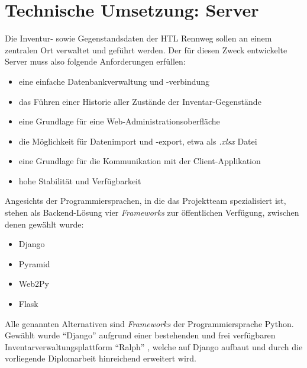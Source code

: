 \hypertarget{technische-umsetzung-server}{%
\section{Technische Umsetzung:
Server}\label{technische-umsetzung-server}}

Die Inventur- sowie Gegenstandsdaten der HTL Rennweg sollen an einem
zentralen Ort verwaltet und geführt werden. Der für diesen Zweck
entwickelte Server muss also folgende Anforderungen erfüllen:

\begin{itemize}
\tightlist
\item
  eine einfache Datenbankverwaltung und -verbindung
\item
  das Führen einer Historie aller Zustände der Inventar-Gegenstände
\item
  eine Grundlage für eine Web-Administrationsoberfläche
\item
  die Möglichkeit für Datenimport und -export, etwa als
  \emph{.xlsx} Datei
\item
  eine Grundlage für die Kommunikation mit der Client-Applikation
\item
  hohe Stabilität und Verfügbarkeit
\end{itemize}

Angesichts der Programmiersprachen, in die das Projektteam spezialisiert
ist, stehen als Backend-Lösung vier
\emph{Frameworks}
zur öffentlichen Verfügung, zwischen denen gewählt wurde:

\begin{itemize}
\tightlist
\item
  Django \cite{django}
\item
  Pyramid \cite{pyramid}
\item
  Web2Py \cite{web2py}
\item
  Flask \cite{flask}
\end{itemize}

Alle genannten Alternativen sind
\emph{Frameworks}
der Programmiersprache Python. Gewählt wurde ``Django'' aufgrund einer
bestehenden und frei verfügbaren Inventarverwaltungsplattform ``Ralph''
\cite{ralph}, welche auf Django aufbaut und durch die vorliegende
Diplomarbeit hinreichend erweitert wird.

